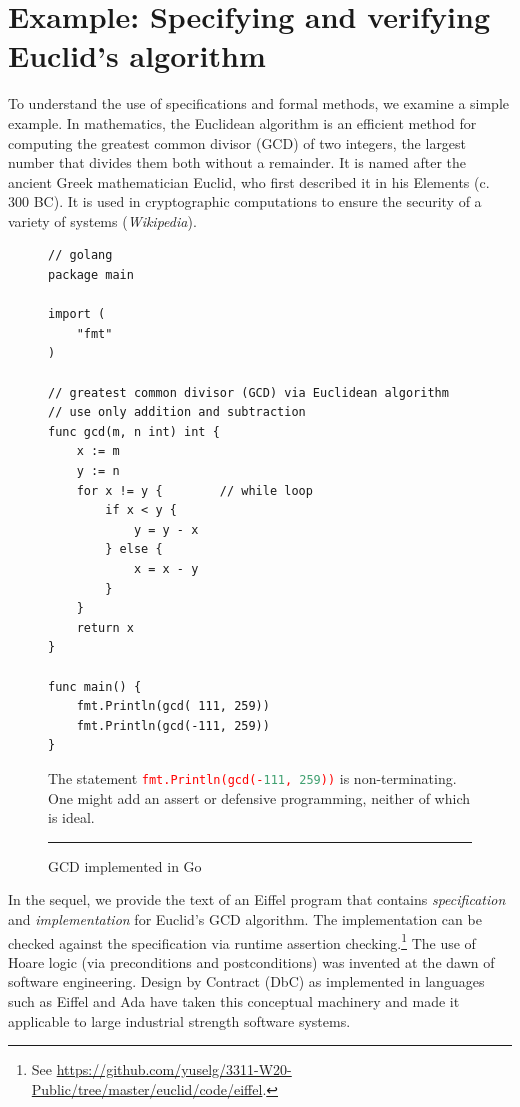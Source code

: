 \documentclass[runningheads,12pt]{article}
\newcommand{\e}[1]{\lstinline[language=eiffel]|#1|}
\begin{document}
\section{Example: Specifying and verifying Euclid's algorithm}

To understand the use of specifications and formal methods, we examine a simple example.  In mathematics, the Euclidean algorithm is an efficient method for computing the greatest common divisor (GCD) of two integers, the largest number that divides them both without a remainder. It is named after the ancient Greek mathematician Euclid, who first described it in his Elements (c. 300 BC). It is used in cryptographic computations to ensure the security of a variety of systems (\textit{Wikipedia}). 

\begin{figure}[!htb]
\begin{framed}
\begin{Verbatim}[fontsize=\small]
// golang
package main

import (
	"fmt"
)

// greatest common divisor (GCD) via Euclidean algorithm
// use only addition and subtraction 
func gcd(m, n int) int {
	x := m
	y := n
	for x != y {		// while loop
		if x < y {
			y = y - x
		} else {
			x = x - y
		}
	}
	return x
}

func main() {
	fmt.Println(gcd( 111, 259))
	fmt.Println(gcd(-111, 259))
}	
\end{Verbatim}
\end{framed}
The statement \textcolor{red}{\e{fmt.Println(gcd(-111, 259))}} is non-terminating. One might add an assert or defensive programming, neither of which is ideal. 
\caption{GCD implemented in Go}
\label{fig:gcd-c}
\noindent\rule{\textwidth}{0.5pt}
\end{figure}

In the sequel, we provide the text of an Eiffel program that contains \textit{specification} and  \textit{implementation} for Euclid's GCD algorithm. The implementation can be checked against the specification via runtime assertion checking.\footnote{%
See \url{https://github.com/yuselg/3311-W20-Public/tree/master/euclid/code/eiffel}.} The use of Hoare logic (via preconditions and postconditions) was invented at the dawn of software engineering. Design by Contract (DbC) as implemented in languages such as Eiffel and Ada have taken this conceptual machinery and made it applicable to large industrial strength software systems. 
 
\end{document}
